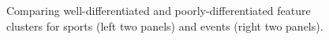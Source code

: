 \begin{center}
\begin{figure}
\begin{minipage}{0.2\textwidth}
\begin{center}
      \end{center}
    \end{minipage}
    \caption{Comparing well-differentiated and poorly-differentiated feature clusters for sports (left two panels) and events (right two panels).}
    \label{sports-features}
   \end{figure} 
\end{center} 
